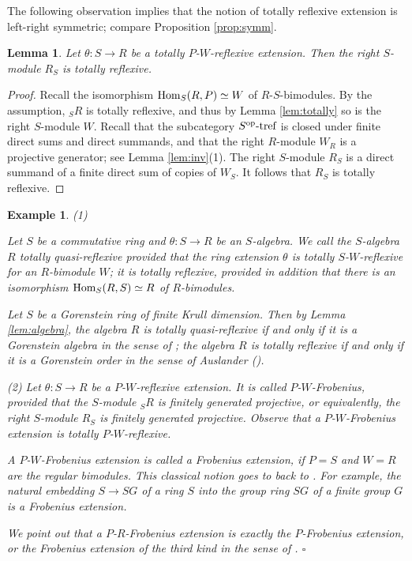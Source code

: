 \documentclass[a4paper]{amsart}
\newtheorem{lem}[thm]{Lemma}
\newtheorem{exm}[thm]{Example}
\theoremstyle{definition}
\theoremstyle{remark}
\numberwithin{equation}{section}
\begin{document}
The following observation implies that the notion of totally reflexive extension is left-right symmetric; compare  Proposition \ref{prop:symm}.

\begin{lem}
Let  $\theta\colon S\rightarrow R$ be a totally $P$-$W$-reflexive extension. Then the right $S$-module $R_S$ is
totally reflexive.
\end{lem}

\begin{proof}
Recall the isomorphism ${\rm Hom}_S(R, P)\simeq W$ of $R$-$S$-bimodules. By the assumption, $_SR$ is totally reflexive, and
thus by Lemma \ref{lem:totally}  so is the right $S$-module $W$. Recall that the subcategory $S^{\rm op}\mbox{-tref}$ is closed under finite direct sums and direct summands, and that the right $R$-module $W_R$ is a projective generator; see Lemma \ref{lem:inv}(1).  The right $S$-module $R_S$ is a direct summand of a finite direct sum of copies of $W_S$. It follows that  $R_S$ is totally reflexive.
\end{proof}

\begin{exm}\label{exm:1}
{\rm (1)} {\rm Let $S$ be a commutative ring and  $\theta\colon S\rightarrow R$ be an $S$-algebra. We call the $S$-algebra $R$ \emph{totally quasi-reflexive} provided that the ring extension $\theta$ is totally $S$-$W$-reflexive for an $R$-bimodule $W$; it is \emph{totally reflexive}, provided in addition that there is an isomorphism ${\rm Hom}_S(R, S)\simeq R$ of $R$-bimodules.

Let $S$ be a Gorenstein ring of finite Krull dimension. Then by Lemma \ref{lem:algebra}, the algebra $R$ is totally quasi-reflexive if and only if it  is a Gorenstein algebra in the sense of \cite[Definition 3.1]{AH}; the algebra $R$ is totally reflexive if and only if  it is a Gorenstein order in the sense of Auslander (\cite[Chapter III]{Aus}).}

{
{\rm (2)} \rm Let $\theta\colon S\rightarrow R$ be a $P$-$W$-reflexive extension. It is called \emph{$P$-$W$-Frobenius},  provided that the $S$-module $_SR$ is finitely generated projective, or equivalently, the right $S$-module $R_S$ is finitely generated projective. Observe that a $P$-$W$-Frobenius extension is totally $P$-$W$-reflexive.

 A $P$-$W$-Frobenius extension is called a \emph{Frobenius extension}, if $P=S$ and  $W=R$ are the regular bimodules. This classical notion goes to back to \cite{NT}. For example, the natural embedding $S\rightarrow SG$ of a ring $S$ into the group ring $SG$ of a finite group $G$ is a Frobenius extension.

We point out that a  $P$-$R$-Frobenius extension is exactly the $P$-Frobenius extension, or the Frobenius extension of the third kind in the sense of \cite[Definition 7.2]{KS}. \hfill $\square$}

\end{exm}
\end{document}
